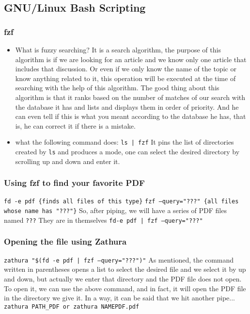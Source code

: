 \documentclass[12pt]{article}
\begin{document}
\newpage
\subsection{GNU/Linux Bash Scripting}


\subsubsection{fzf}
\begin{itemize}
  \item What is fuzzy searching?\newline
  It is a search algorithm, the purpose of this algorithm is if we are looking for an article and we know only one article that includes that discussion.
Or even if we only know the name of the topic or know anything related to it, this operation will be executed at the time of searching with the help of this algorithm.
The good thing about this algorithm is that it ranks based on the number of matches of our search with the database it has and lists and displays them in order of priority.
And he can even tell if this is what you meant according to the database he has, that is, he can correct it if there is a mistake.
\item what the following command does: \texttt{ls | fzf}\newline
It pins the list of directories created by \texttt{ls} and produces a mode, one can select the desired directory by scrolling up and down and enter it.
\end{itemize}



\subsubsection{Using fzf to find your favorite PDF}
\texttt{fd -e pdf \{finds all files of this type\}}\newline
\texttt{fzf --query="???" \{all files whose name has "???"\}}\newline
So, after piping, we will have a series of PDF files named \texttt{???} They are in themselves\newline
\texttt{fd-e pdf | fzf --query="???"}


\subsubsection{Opening the file using Zathura}
\texttt{zathura "\$(fd -e pdf | fzf --query="???")"} \newline
As mentioned, the command written in parentheses opens a list to select the desired file and we select it by up and down, but actually we enter that directory and the PDF file does not open.
To open it, we can use the above command, and in fact, it will open the PDF file in the directory we give it.
\newline
In a way, it can be said that we hit another pipe...
\newline
\texttt{zathura PATH\_PDF or zathura NAMEPDF.pdf}
\end{document}
